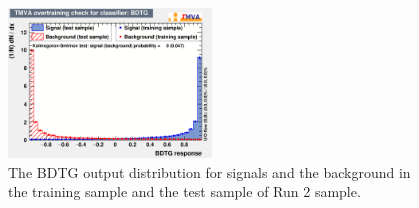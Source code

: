 \begin{figure}[!tbh]
\centering
\includegraphics[width=0.48\textwidth]{Figures/08_JpsipK/mva_plots/overtrain_BDTG.eps}
\caption{
   The BDTG output distribution for signals and the background in the training sample and the test sample of Run 2 sample.}
\label{fig:MVAMonitor}
\end{figure}















